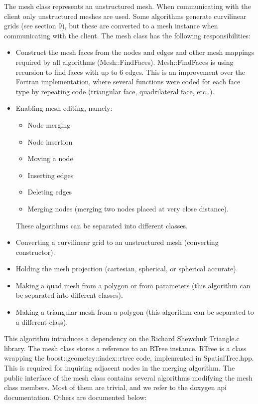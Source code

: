 \documentclass[biblatex]{deltares_manual}
\begin{document}
The mesh class represents an unstructured mesh. When communicating with the client only unstructured meshes are used. Some algorithms generate curvilinear grids (see section 9), but these are converted to a mesh instance when communicating with the client. The mesh class has the following responsibilities:
\begin{itemize}
\item Construct the mesh faces from the nodes and edges and other mesh mappings required by all algorithms (Mesh::FindFaces). Mesh::FindFaces is using recursion to find faces with up to 6 edges. This is an improvement over the Fortran implementation, where several functions were coded for each face type by repeating code (triangular face, quadrilateral face, etc..).
\item Enabling mesh editing, namely:
\begin{itemize}
\item Node merging
\item Node insertion
\item Moving a node
\item Inserting edges
\item Deleting edges
\item Merging nodes (merging two nodes placed at very close distance).
\end{itemize}
These algorithms can be separated into different classes.
\item Converting a curvilinear grid to an unstructured mesh (converting constructor).
\item Holding the mesh projection (cartesian, spherical, or spherical accurate).
\item Making a quad mesh from a polygon or from parameters (this algorithm can be separated into different classes).
\item Making a triangular mesh from a polygon (this algorithm can be separated to a different class).
\end{itemize}
This algorithm introduces a dependency on the Richard Shewchuk Triangle.c library.
The mesh class stores a reference to an RTree instance. RTree is a class wrapping the boost::geometry::index::rtree code, implemented in SpatialTree.hpp. This is required for inquiring adjacent nodes in the merging algorithm.
The public interface of the mesh class contains several algorithms modifying the mesh class members. Most of them are trivial, and we refer to the doxygen api documentation. Others are documented below:
\end{document}
